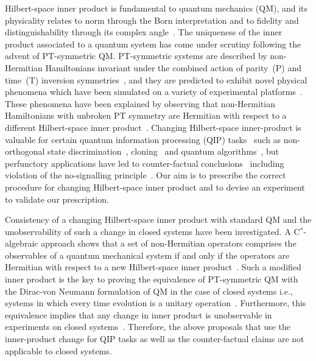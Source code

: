 \documentclass[amsmath,amssymb,aps,pra,superscriptaddress,twocolumn]{revtex4-2}
\begin{document}
\twocolumngrid
Hilbert-space inner product is fundamental to quantum mechanics (QM), and its physicality relates 
to norm through the Born interpretation and to fidelity and distinguishability through its complex angle~\cite{SN21}.
The uniqueness of the inner product associated to a quantum system has come under scrutiny 
following the advent of PT-symmetric QM.
PT-symmetric systems are described by non-Hermitian Hamiltonians invariant under the combined action of parity~(P) and time~(T) 
inversion symmetries~\cite{BB98,BBJ02,BBJ03,Ben05}, and they are predicted to exhibit novel physical phenomena which
have been simulated on a variety of experimental platforms~\cite{RME+10,SLZ+11,BDG+12,POS+14,ZZS+16,XZB+17,EMK+18,WLG+19,ZLW+20}. 
These phenomena have been explained by observing that non-Hermitian Hamiltonians with 
unbroken PT symmetry are Hermitian with respect to a different Hilbert-space inner product~\cite{BBJ02,Mos03a,MECM08,JMCN19}.
Changing Hilbert-space inner-product is valuable for certain quantum information processing (QIP) tasks~\cite{Cro15} 
such as non-orthogonal state discrimination~\cite{BBC+13}, cloning~\cite{ZWX+20} and quantum algorithms~\cite{BBJM07,Mos09},
but perfunctory applications have led to counter-factual conclusions~\cite{Cro15,Pat14,CCC14} 
including violation of the no-signalling principle~\cite{YHFL14}. 
Our aim is to prescribe the correct procedure for changing Hilbert-space inner product and
to devise an experiment to validate our prescription.



Consistency  of a changing Hilbert-space inner product
with standard QM  and the 
unobservability of such a change in closed systems 
have been investigated.
A C$^*$-algebraic approach shows that
a set of non-Hermitian operators comprises the
observables of a
quantum mechanical system if and only if the operators are Hermitian with respect to
a new Hilbert-space inner product~\cite{SGH92}.
Such a modified inner product is the key to proving the equivalence
of PT-symmetric QM with 
the Dirac-von Neumann formulation of QM in the case of closed systems i.e., systems in which 
every time evolution is a unitary operation~\cite{BBJ02,Mos03a,Mos10a,Mos10b,Zno15,Mos18,ZWG19,JMCN19}.
Furthermore, 
this equivalence implies that any change in inner product is unobservable in experiments on closed systems~\cite{Bro16}.
Therefore, the above proposals that use the inner-product change for QIP tasks
as well as the counter-factual claims are not applicable to closed systems.
\end{document}
